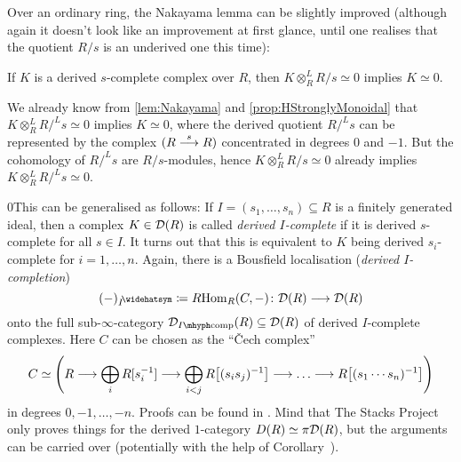 Over an ordinary ring, the Nakayama lemma can be slightly improved (although again it doesn't look like an improvement at first glance, until one realises that the quotient $R/s$ is an underived one this time):
\begin{cor*}\label{cor*:DerivedNakayama}
	If $K$ is a derived $s$-complete complex over $R$, then $K\otimes_R^LR/s\simeq 0$ implies $K\simeq 0$.
\end{cor*}
\begin{proof*}
	We already know from \cref{lem:Nakayama} and \cref{prop:HStronglyMonoidal} that $K\otimes_R^LR/^Ls\simeq 0$ implies $K\simeq 0$, where the derived quotient $R/^Ls$ can be represented by the complex $(R\morphism[s] R)$ concentrated in degrees $0$ and $-1$. But the cohomology of $R/^Ls$ are $R/s$-modules, hence $K\otimes_R^LR/s\simeq 0$ already implies $K\otimes_R^LR/^Ls\simeq 0$.
\end{proof*}
\if0This can be generalised as follows: If $I=(s_1,\dotsc,s_n)\subseteq R$ is a finitely generated ideal, then a complex $K\in\mathcal{D}(R)$ is called \emph{derived $I$-complete} if it is derived $s$-complete for all $s\in I$. It turns out that this is equivalent to $K$ being derived $s_i$-complete for $i=1,\dotsc,n$. Again, there is a Bousfield localisation (\emph{derived $I$-completion})
\begin{equation*}
	(-)_I^\complete\coloneqq R\!\Hom_R(C,-)\colon \Dd(R)\morphism \Dd(R)
\end{equation*}
onto the full sub-$\infty$-category $\Dd_{I\mhyph\mathrm{comp}}(R)\subseteq \Dd(R)$ of derived $I$-complete complexes. Here $C$ can be chosen as the \enquote{\v Cech complex}
\begin{equation*}
	C\simeq \Bigg(R\morphism \bigoplus_{i}R[s_i^{-1}]\morphism \bigoplus_{i<j}R\big[(s_is_j)^{-1}\big]\morphism\dotso\morphism R\big[(s_1\dotsm s_n)^{-1}\big]\Bigg)
\end{equation*}
in degrees $0,-1,\dotsc,-n$. Proofs can be found in \cite[]{stacks-project}. Mind that The Stacks Project only proves things for the derived $1$-category $D(R)\simeq \pi\mathcal{D}(R)$, but the arguments can be carried over (potentially with the help of Corollary~).

